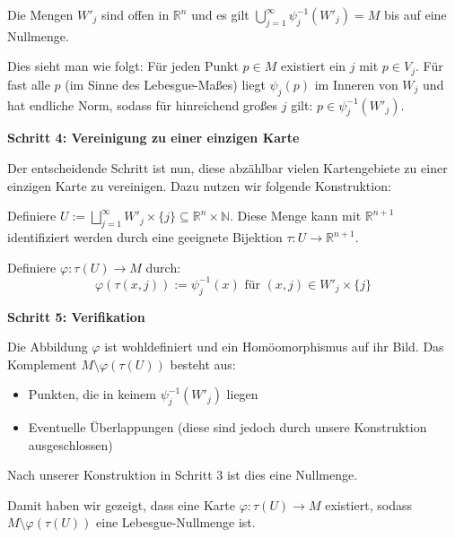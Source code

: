 \documentclass{article}
\begin{document}
Die Mengen $W'_j$ sind offen in $\mathbb{R}^n$ und es gilt $\bigcup_{j=1}^{\infty} \psi_j^{-1}(W'_j) = M$ bis auf eine Nullmenge.

Dies sieht man wie folgt: Für jeden Punkt $p \in M$ existiert ein $j$ mit $p \in V_j$. Für fast alle $p$ (im Sinne des Lebesgue-Maßes) liegt $\psi_j(p)$ im Inneren von $W_j$ und hat endliche Norm, sodass für hinreichend großes $j$ gilt: $p \in \psi_j^{-1}(W'_j)$.

\textbf{Schritt 4: Vereinigung zu einer einzigen Karte}

Der entscheidende Schritt ist nun, diese abzählbar vielen Kartengebiete zu einer einzigen Karte zu vereinigen. Dazu nutzen wir folgende Konstruktion:

Definiere $U := \bigsqcup_{j=1}^{\infty} W'_j \times \{j\} \subseteq \mathbb{R}^n \times \mathbb{N}$. Diese Menge kann mit $\mathbb{R}^{n+1}$ identifiziert werden durch eine geeignete Bijektion $\tau: U \to \mathbb{R}^{n+1}$.

Definiere $\varphi: \tau(U) \to M$ durch:
$$\varphi(\tau(x,j)) := \psi_j^{-1}(x) \text{ für } (x,j) \in W'_j \times \{j\}$$

\textbf{Schritt 5: Verifikation}

Die Abbildung $\varphi$ ist wohldefiniert und ein Homöomorphismus auf ihr Bild. Das Komplement $M \setminus \varphi(\tau(U))$ besteht aus:
\begin{itemize}
\item Punkten, die in keinem $\psi_j^{-1}(W'_j)$ liegen
\item Eventuelle Überlappungen (diese sind jedoch durch unsere Konstruktion ausgeschlossen)
\end{itemize}

Nach unserer Konstruktion in Schritt 3 ist dies eine Nullmenge.

Damit haben wir gezeigt, dass eine Karte $\varphi: \tau(U) \to M$ existiert, sodass $M \setminus \varphi(\tau(U))$ eine Lebesgue-Nullmenge ist.
\end{document}
